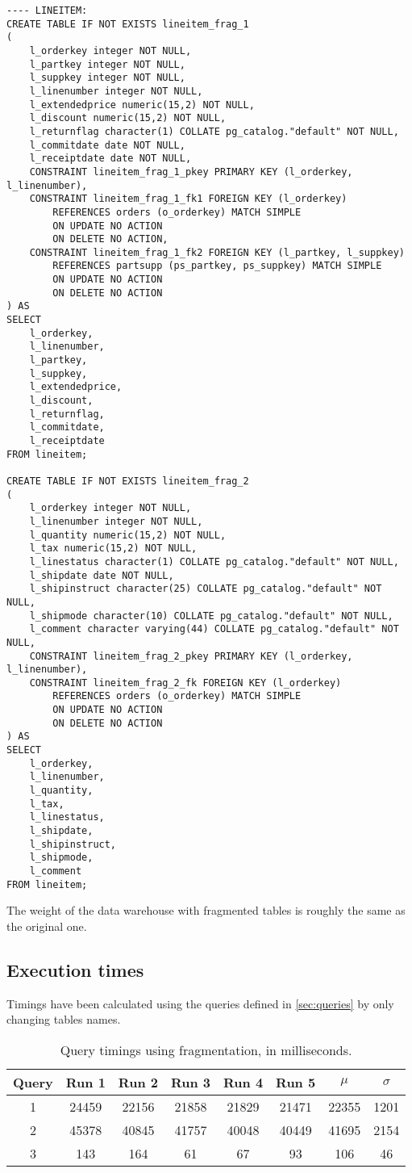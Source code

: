 \begin{lstlisting}
---- LINEITEM:
CREATE TABLE IF NOT EXISTS lineitem_frag_1
(
    l_orderkey integer NOT NULL,
    l_partkey integer NOT NULL,
    l_suppkey integer NOT NULL,
    l_linenumber integer NOT NULL,
    l_extendedprice numeric(15,2) NOT NULL,
    l_discount numeric(15,2) NOT NULL,
    l_returnflag character(1) COLLATE pg_catalog."default" NOT NULL,
    l_commitdate date NOT NULL,
    l_receiptdate date NOT NULL,
    CONSTRAINT lineitem_frag_1_pkey PRIMARY KEY (l_orderkey, l_linenumber),
    CONSTRAINT lineitem_frag_1_fk1 FOREIGN KEY (l_orderkey)
        REFERENCES orders (o_orderkey) MATCH SIMPLE
        ON UPDATE NO ACTION
        ON DELETE NO ACTION,
    CONSTRAINT lineitem_frag_1_fk2 FOREIGN KEY (l_partkey, l_suppkey)
        REFERENCES partsupp (ps_partkey, ps_suppkey) MATCH SIMPLE
        ON UPDATE NO ACTION
        ON DELETE NO ACTION
) AS
SELECT
	l_orderkey,
	l_linenumber,
	l_partkey,
	l_suppkey,
	l_extendedprice,
	l_discount,
	l_returnflag,
	l_commitdate,
	l_receiptdate
FROM lineitem;

CREATE TABLE IF NOT EXISTS lineitem_frag_2
(
    l_orderkey integer NOT NULL,
    l_linenumber integer NOT NULL,
    l_quantity numeric(15,2) NOT NULL,
    l_tax numeric(15,2) NOT NULL,
    l_linestatus character(1) COLLATE pg_catalog."default" NOT NULL,
    l_shipdate date NOT NULL,
    l_shipinstruct character(25) COLLATE pg_catalog."default" NOT NULL,
    l_shipmode character(10) COLLATE pg_catalog."default" NOT NULL,
    l_comment character varying(44) COLLATE pg_catalog."default" NOT NULL,
    CONSTRAINT lineitem_frag_2_pkey PRIMARY KEY (l_orderkey, l_linenumber),
    CONSTRAINT lineitem_frag_2_fk FOREIGN KEY (l_orderkey)
        REFERENCES orders (o_orderkey) MATCH SIMPLE
        ON UPDATE NO ACTION
        ON DELETE NO ACTION
) AS
SELECT
	l_orderkey,
	l_linenumber,
	l_quantity,
	l_tax,
	l_linestatus,
	l_shipdate,
	l_shipinstruct,
	l_shipmode,
	l_comment
FROM lineitem;
\end{lstlisting}

The weight of the data warehouse with fragmented tables is roughly the same as the original one.

\subsection{Execution times}

Timings have been calculated using the queries defined in \autoref{sec:queries} by only changing tables names.

\begin{table}[!h]
\centering
\begin{tabular}{|| c | c c c c c | c c ||} 
 \hline
 Query & Run 1 & Run 2 & Run 3 & Run 4 & Run 5 & 	$\mu$ & $\sigma$ \\ [0.5ex] 
 \hline\hline
 1 & 24459 & 22156 & 21858 & 21829 & 21471 & 22355 & 1201 \\ 
 \hline
 2 & 45378 & 40845 & 41757 & 40048 & 40449 & 41695 & 2154 \\
 \hline
 3 & 143 & 164 & 61 & 67 & 93 & 106 & 46 \\
 \hline
\end{tabular}
  \caption{Query timings using fragmentation, in milliseconds.}
  \label{tab:fragmentationtimings}
\end{table}